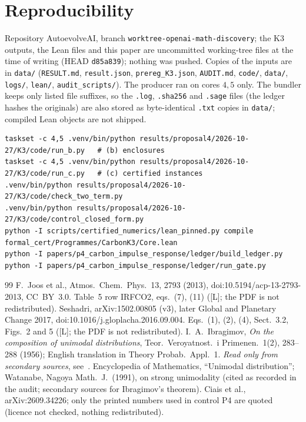 \documentclass[10pt]{article}
\newcommand{\tier}[1]{\textsf{[#1]}}
\newcommand{\tL}{\tier{L}}
\theoremstyle{plain}
\begin{document}
\section{Reproducibility}\label{sec:repro}
Repository AutoevolveAI, branch \texttt{worktree-openai-math-discovery}; the K3 outputs, the Lean files and this paper are uncommitted working-tree files at the time of writing (HEAD \texttt{d85a839}); nothing was pushed. Copies of the inputs are in \texttt{data/} (\texttt{RESULT.md}, \texttt{result.json}, \texttt{prereg\_K3.json}, \texttt{AUDIT.md}, \texttt{code/}, \texttt{data/}, \texttt{logs/}, \texttt{lean/}, \texttt{audit\_scripts/}). The producer ran on cores $4,5$ only. The bundler keeps only listed file suffixes, so the \texttt{.log}, \texttt{.sha256} and \texttt{.sage} files (the ledger hashes the originals) are also stored as byte-identical \texttt{.txt} copies in \texttt{data/}; compiled Lean objects are not shipped.
\begin{lstlisting}[basicstyle=\ttfamily\scriptsize]
taskset -c 4,5 .venv/bin/python results/proposal4/2026-10-27/K3/code/run_b.py   # (b) enclosures
taskset -c 4,5 .venv/bin/python results/proposal4/2026-10-27/K3/code/run_c.py   # (c) certified instances
.venv/bin/python results/proposal4/2026-10-27/K3/code/check_two_term.py
.venv/bin/python results/proposal4/2026-10-27/K3/code/control_closed_form.py
python -I scripts/certified_numerics/lean_pinned.py compile formal_cert/Programmes/CarbonK3/Core.lean
python -I papers/p4_carbon_impulse_response/ledger/build_ledger.py
python -I papers/p4_carbon_impulse_response/ledger/run_gate.py
\end{lstlisting}

\begin{thebibliography}{99}\small
{} F.\ Joos et al., Atmos.\ Chem.\ Phys.\ 13, 2793 (2013), doi:10.5194/acp-13-2793-2013, CC~BY~3.0. Table~5 row IRFCO2, eqs.\ (7), (11) (\tL; the PDF is not redistributed).
 Seshadri, arXiv:1502.00805 (v3), later Global and Planetary Change 2017, doi:10.1016/j.gloplacha.2016.09.004. Eqs.\ (1), (2), (4), Sect.~3.2, Figs.\ 2 and 5 (\tL; the PDF is not redistributed).
 I.\ A.\ Ibragimov, \emph{On the composition of unimodal distributions}, Teor.\ Veroyatnost.\ i Primenen.\ 1(2), 283--288 (1956); English translation in Theory Probab.\ Appl.\ 1. \emph{Read only from secondary sources}, see~\cite{wat}.
 Encyclopedia of Mathematics, ``Unimodal distribution''; Watanabe, Nagoya Math.\ J.\ (1991), on strong unimodality (cited as recorded in the audit; secondary sources for Ibragimov's theorem).
 Ciais et al., arXiv:2609.34226; only the printed numbers used in control P4 are quoted (licence not checked, nothing redistributed).
\end{thebibliography}
\end{document}
